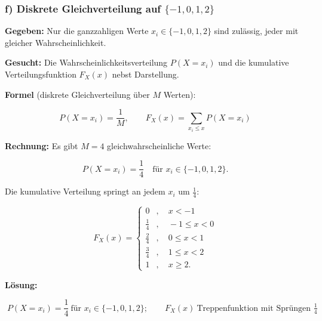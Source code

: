 \subsubsection*{f) Diskrete Gleichverteilung auf $\{-1, 0, 1, 2\}$}

\begin{beispiel}

\textbf{Gegeben:} Nur die ganzzahligen Werte $x_i \in \{-1, 0, 1, 2\}$ sind
zulässig, jeder mit gleicher Wahrscheinlichkeit.

\textbf{Gesucht:} Die Wahrscheinlichkeitsverteilung $P(X = x_i)$ und die
kumulative Verteilungsfunktion $F_X(x)$ nebst Darstellung.

\textbf{Formel} (diskrete Gleichverteilung über $M$ Werten):

$$
P(X = x_i) = \frac{1}{M}, \qquad F_X(x) = \sum_{x_i \leq x} P(X = x_i)
$$

\textbf{Rechnung:} Es gibt $M = 4$ gleichwahrscheinliche Werte:

$$
P(X = x_i) = \frac{1}{4} \quad \text{für } x_i \in \{-1, 0, 1, 2\}.
$$

Die kumulative Verteilung springt an jedem $x_i$ um $\tfrac14$:

$$
F_X(x) = \begin{cases}
0 & , \quad x < -1 \\
\tfrac{1}{4} & , \quad -1 \leq x < 0 \\
\tfrac{2}{4} & , \quad 0 \leq x < 1 \\
\tfrac{3}{4} & , \quad 1 \leq x < 2 \\
1 & , \quad x \geq 2.
\end{cases}
$$

\textbf{Lösung:}

$$
\boxed{\;P(X = x_i) = \frac{1}{4}\ \text{für } x_i \in \{-1,0,1,2\}; \qquad
F_X(x)\ \text{Treppenfunktion mit Sprüngen } \tfrac14\;}
$$

\begin{center}
\end{center}

\end{beispiel}

